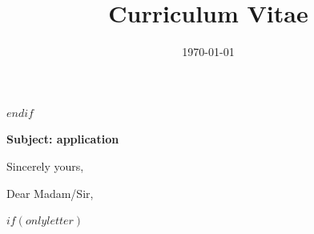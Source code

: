 \documentclass[10pt,a4paper,sans]{moderncv}
\title{Curriculum Vitae}
\begin{document}
$endif$

\date{\today}
\opening{\textbf{Subject: application}}
\closing{Sincerely yours,}

\makelettertitle

Dear Madam/Sir,

\justify

\lipsum[1-5]
\makeletterclosing

$if(onlyletter)$
\end{document}
